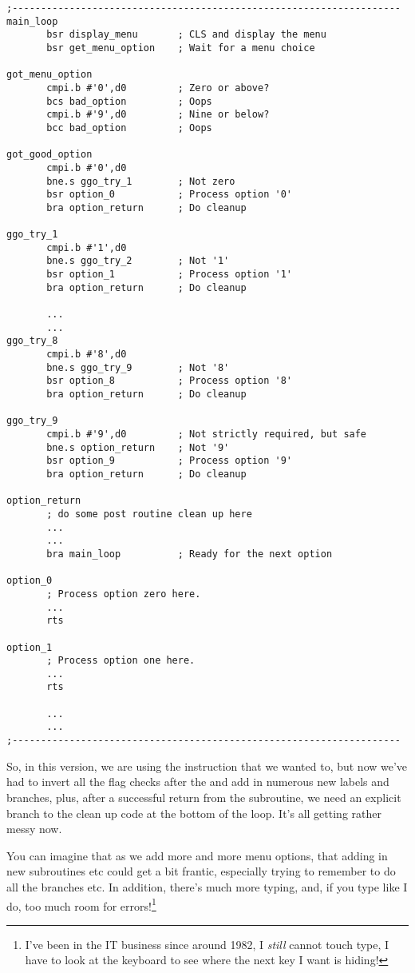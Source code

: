 \begin{lstlisting}[firstnumber=1,caption={Processing User Options - Another Improved First Attempt}]
;--------------------------------------------------------------------
main_loop
       bsr display_menu       ; CLS and display the menu
       bsr get_menu_option    ; Wait for a menu choice
       
got_menu_option
       cmpi.b #'0',d0         ; Zero or above?
       bcs bad_option         ; Oops
       cmpi.b #'9',d0         ; Nine or below?
       bcc bad_option         ; Oops
       
got_good_option
       cmpi.b #'0',d0
       bne.s ggo_try_1        ; Not zero
       bsr option_0           ; Process option '0'
       bra option_return      ; Do cleanup

ggo_try_1
       cmpi.b #'1',d0
       bne.s ggo_try_2        ; Not '1'
       bsr option_1           ; Process option '1'
       bra option_return      ; Do cleanup

       ...
       ...
ggo_try_8
       cmpi.b #'8',d0
       bne.s ggo_try_9        ; Not '8'
       bsr option_8           ; Process option '8'
       bra option_return      ; Do cleanup

ggo_try_9
       cmpi.b #'9',d0         ; Not strictly required, but safe
       bne.s option_return    ; Not '9'
       bsr option_9           ; Process option '9'
       bra option_return      ; Do cleanup

option_return           
       ; do some post routine clean up here      
       ...
       ...
       bra main_loop          ; Ready for the next option

option_0
       ; Process option zero here.
       ...
       rts
       
option_1
       ; Process option one here.
       ...
       rts

       ...
       ...
;--------------------------------------------------------------------
\end{lstlisting}

So, in this version, we are using the  instruction that we wanted to, but now we've had to invert all the flag checks after the  and add in numerous new labels and branches, plus, after a successful return from the subroutine, we need an explicit branch to the clean up code at the bottom of the loop. It's all getting rather messy now.

You can imagine that as we add more and more menu options, that adding in new subroutines etc could get a bit frantic, especially trying to remember to do all the branches etc. In addition, there's much more typing, and, if you type like I do, too much room for errors!\footnote{I've been in the IT business since around 1982, I \emph{still} cannot touch type, I have to look at the keyboard to see where the next key I want is hiding!}

